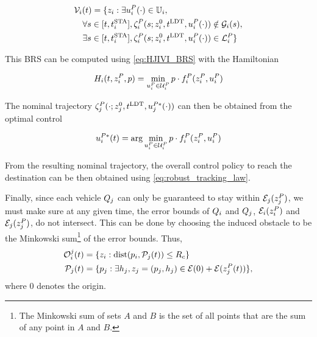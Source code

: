 \begin{equation}
\label{eq:BRS_rttplan}
\begin{aligned}
&\brs_i(t) = \{\state_i: \exists \ctrl_i^P(\cdot) \in \cfset_i, \\
&\quad\forall s \in [t, \sta_i], \traj_i^P(s; \state^0_i, \ldt, \ctrl_i^P(\cdot)) \notin \obsset_i(s), \\
&\quad\exists s \in [t, \sta_i], \traj_i^P(s; \state^0_i, \ldt, \ctrl_i^P(\cdot)) \in \targetset_i^P\}
\end{aligned}
\end{equation}

This BRS can be computed using \eqref{eq:HJIVI_BRS} with the Hamiltonian

\begin{equation}
\label{eq:rttham}
\ham_i(t, \state_i^P, \costate) = \min_{\ctrl_i^P \in \cset_i^P} \costate \cdot \fdyn_i^P(\state_i^P, \ctrl_i^P)
\end{equation}

The nominal trajectory $\zeta_j^P(\cdot; z^0_j, t^\text{LDT}, u_j^{P*}(\cdot))$ can then be obtained from the optimal control

\begin{equation}
\label{eq:rttOptCtrl}
\ctrl_i^{P*}(t) = \arg \min_{\ctrl_i^P \in \cset_i^P} \costate \cdot \fdyn_i^P(\state_i^P, \ctrl_i^P)
\end{equation}

From the resulting nominal trajectory, the overall control policy to reach the destination can be then obtained using \eqref{eq:robust_tracking_law}.

Finally, since each vehicle $Q_{j}$ can only be guaranteed to stay within $\mathcal{E}_j(z_j^P)$, we must make sure at any given time, the error bounds of $Q_{i}$ and $Q_{j}$, $\mathcal{E}_i(z_i^P)$ and $\mathcal{E}_j(z_j^P)$, do not intersect. This can be done by choosing the induced obstacle to be the Minkowski sum\footnote{The Minkowski sum of sets $A$ and $B$ is the set of all points that are the sum of any point in $A$ and $B$.} of the error bounds. Thus,
\vspace{-0.3em}
\begin{equation}
\begin{aligned}
\mathcal{O}_i^j(t) &= \{z_i: \text{dist}(p_i, \mathcal{P}_j(t)) \le R_c \} \\
\mathcal{P}_j(t) &= \{p_j: \exists h_j, z_j = (p_j, h_j) \in \mathcal{E}(0) + \mathcal{E}(z_j^P(t)) \},
\end{aligned}
\end{equation}
\noindent where $0$ denotes the origin. 
